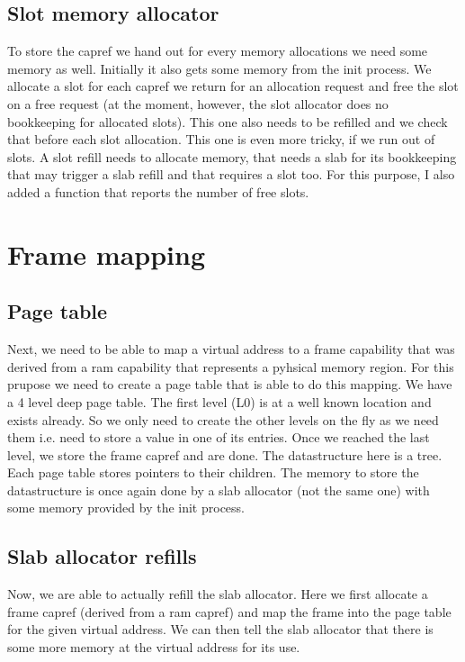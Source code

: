 \subsection{Slot memory allocator}

To store the capref we hand out for every memory allocations we need some memory
as well. Initially it also gets some memory from the init process.  We allocate
a slot for each capref we return for an allocation request and free the slot on
a free request (at the moment, however, the slot allocator does no bookkeeping
for allocated slots).  This one also needs to be refilled and we check that
before each slot allocation. This one is even more tricky, if we run out of
slots. A slot refill needs to allocate memory, that needs a slab for its
bookkeeping that may trigger a slab refill and that requires a slot too.  For
this purpose, I also added a function that reports the number of free slots.

\section{Frame mapping}

\subsection{Page table}

Next, we need to be able to map a virtual address to a frame capability that was
derived from a ram capability that represents a pyhsical memory region.  For
this prupose we need to create a page table that is able to do this mapping.  We
have a 4 level deep page table. The first level (L0) is at a well known location
and exists already. So we only need to create the other levels on the fly as we
need them i.e. need to store a value in one of its entries.  Once we reached the
last level, we store the frame capref and are done.  The datastructure here is a
tree. Each page table stores pointers to their children.  The memory to store
the datastructure is once again done by a slab allocator (not the same one) with
some memory provided by the init process.

\subsection{Slab allocator refills}

Now, we are able to actually refill the slab allocator.  Here we first allocate
a frame capref (derived from a ram capref) and map the frame into the page table
for the given virtual address. We can then tell the slab allocator that there is
some more memory at the virtual address for its use.

